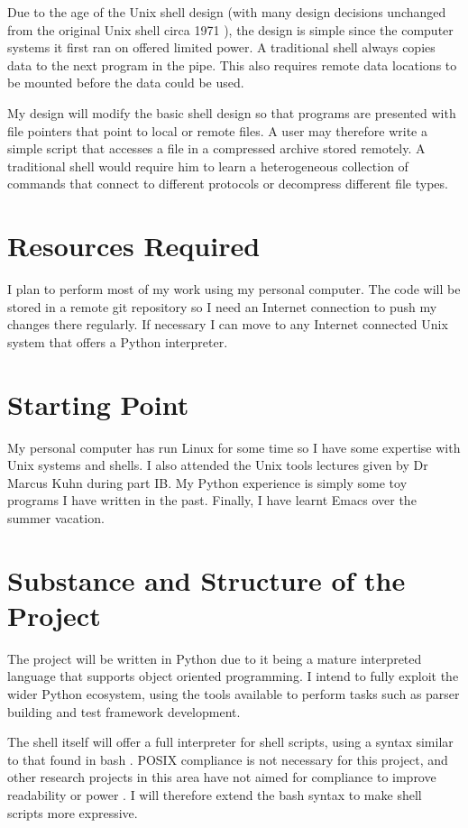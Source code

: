 \documentclass[12pt]{article}
\begin{document}
Due to the age of the Unix shell design (with many design decisions
unchanged from the original Unix shell circa 1971 \cite{firstshell}),
the design is simple since the computer systems it first ran on
offered limited power. A traditional shell always copies data to the
next program in the pipe. This also requires remote data locations to
be mounted before the data could be used.

My design will modify the basic shell design so that programs are
presented with file pointers that point to local or remote files. A
user may therefore write a simple script that accesses a file in a
compressed archive stored remotely. A traditional shell would require
him to learn a heterogeneous collection of commands that connect to
different protocols or decompress different file types.

\section*{Resources Required}
I plan to perform most of my work using my personal computer. The code
will be stored in a remote git repository so I need an Internet
connection to push my changes there regularly. If necessary I can move
to any Internet connected Unix system that offers a Python interpreter.

\section*{Starting Point}
My personal computer has run Linux for some time so I have some
expertise with Unix systems and shells. I also attended the Unix tools
lectures given by Dr Marcus Kuhn during part IB. My Python experience
is simply some toy programs I have written in the past. Finally, I
have learnt Emacs over the summer vacation.

\section*{Substance and Structure of the Project}
The project will be written in Python due to it being a mature
interpreted language that supports object oriented programming. I
intend to fully exploit the wider Python ecosystem, using the tools
available to perform tasks such as parser building and test framework
development.

The shell itself will offer a full interpreter for shell scripts,
using a syntax similar to that found in bash \cite{bash}. POSIX
compliance \cite{posix} is not necessary for this project, and other
research projects in this area have not aimed for compliance to improve
readability \cite{fish} or power \cite{powershell}. I will therefore
extend the bash syntax to make shell scripts more expressive. 
\end{document}

